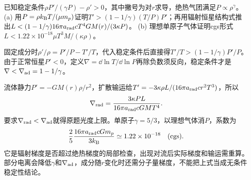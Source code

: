 \begin{exercise}
已知稳定条件$\rho P'/(\gamma P)-\rho'>0$，其中撇号为对$r$求导，绝热气团满足$P\propto\rho^\gamma$。
(a) 用$P=\rho k_{\mathrm B} T/(\mu m_p)$证明$T'>(1-1/\gamma)(T/P)P'$；再用辐射恒星结构式推出$L<(1-1/\gamma)16\pi a_{\rm rad}cT^4GM(r)/(3\kappa P)$。
(b) 理想单原子气体证明cgs形式$L<1.22\times10^{-18}\mu T^3M/(\kappa\rho)$。
\end{exercise}
\begin{solution}
固定成分时$\rho'/\rho=P'/P-T'/T$，代入稳定条件后直接得$T'/T>(1-1/\gamma)P'/P$。由于正常恒星$P'<0$，定义$\nabla=\dd\ln T/\dd\ln P$再除负数须反向，稳定条件才是$\nabla<\nabla_{\rm ad}=1-1/\gamma$。

流体静力$P'=-GM(r)\rho/r^2$，扩散输运给$T'=-3\kappa\rho L/(16\pi a_{\rm rad}cr^2T^3)$，所以
\[
 \nabla_{\rm rad}=\frac{3\kappa PL}{16\pi a_{\rm rad}cGMT^4}.
\]
要求$\nabla_{\rm rad}<\nabla_{\rm ad}$就得原题光度上限。单原子$\gamma=5/3$，以理想气体消$P$，系数为
\[
 \frac25\frac{16\pi a_{\rm rad}cGm_p}{3k_{\mathrm B}}
 \simeq1.22\times10^{-18}\quad(\mathrm{cgs}).
\]
它是辐射梯度是否超过绝热梯度的局部检查，出现对流后实际梯度和输运需重算。部分电离会降低$\gamma$和$\nabla_{\rm ad}$，成分随$r$变化时还需分子量梯度，不能把上式当成无条件稳定性结论。
\end{solution}
